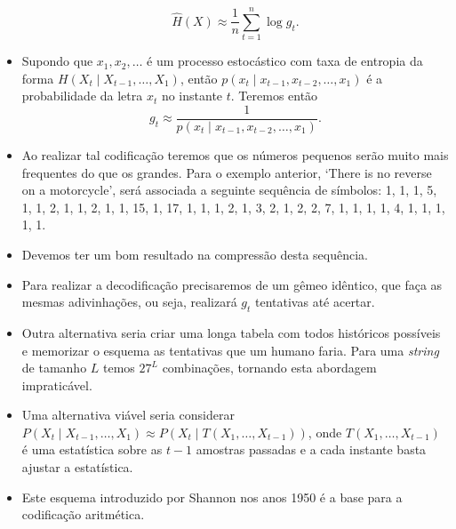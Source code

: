 \begin{frame}[allowframebreaks]
\begin{itemize}
	\begin{equation}
	\hat{H}(X) \approx \frac{1}{n} \sum_{t=1}^{n} \log g_t .
	\end{equation}
  \item Supondo que $x_1,x_2,\ldots$ é um processo estocástico com taxa de entropia da forma $H(X_t \mid X_{t-1}, \ldots, X_1)$, então
	$p(x_t \mid x_{t-1}, x_{t-2}, \ldots, x_1)$ é a probabilidade da letra $x_t$ no instante $t$. Teremos então
	\begin{equation}
	g_t \approx \frac{1}{p(x_t \mid x_{t-1}, x_{t-2}, \ldots, x_1)} .
	\end{equation}
  \item Ao realizar tal codificação teremos que os números pequenos serão muito mais frequentes do que os grandes. Para o
	exemplo anterior, `There is no reverse on a motorcycle', será associada a seguinte sequência de símbolos:
	1, 1, 1, 5, 1, 1, 2, 1, 1, 2, 1, 1, 15, 1, 17, 1, 1, 1, 2, 1, 3, 2, 1, 2, 2, 7, 1, 1, 1, 1, 4, 1, 1, 1, 1, 1.
  \item Devemos ter um bom resultado na compressão desta sequência.
  \item Para realizar a decodificação precisaremos de um gêmeo idêntico, que faça as mesmas adivinhações, ou seja, realizará $g_t$ 
	tentativas até acertar.
  \item Outra alternativa seria criar uma longa tabela com todos históricos possíveis e memorizar o esquema as tentativas que um humano faria.
	Para uma \textit{string} de tamanho $L$ temos $27^L$ combinações, tornando esta abordagem impraticável.
  \item Uma alternativa viável seria considerar $P(X_t \mid X_{t-1}, \ldots, X_1) \approx P(X_t \mid T(X_1, \ldots, X_{t-1}))$, onde
	$T(X_1, \ldots, X_{t-1})$ é uma estatística sobre as $t-1$ amostras passadas e a cada instante basta ajustar a estatística.
  \item Este esquema introduzido por Shannon nos anos 1950 é a base para a codificação aritmética.
  \end{itemize}
\end{frame}


